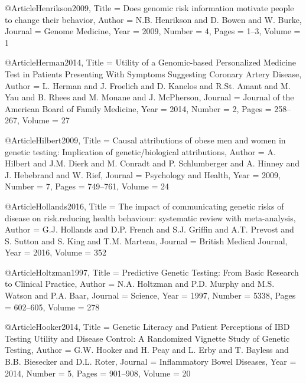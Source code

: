 @Article{Henrikson2009,
  Title                    = {Does genomic risk information motivate people to change their behavior},
  Author                   = {N.B. Henrikson and D. Bowen and W. Burke},
  Journal                  = {Genome Medicine},
  Year                     = {2009},
  Number                   = {4},
  Pages                    = {1--3},
  Volume                   = {1}
}

@Article{Herman2014,
  Title                    = {Utility of a Genomic-based Personalized Medicine Test in Patients Presenting With Symptoms Suggesting Coronary Artery Disease},
  Author                   = {L. Herman and J. Froelich and D. Kanelos and R.St. Amant and M. Yau and B. Rhees and M. Monane and J. McPherson},
  Journal                  = {Journal of the American Board of Family Medicine},
  Year                     = {2014},
  Number                   = {2},
  Pages                    = {258--267},
  Volume                   = {27}
}

@Article{Hilbert2009,
  Title                    = {Causal attributions of obese men and women in genetic testing: Implication of genetic/biological attributions},
  Author                   = {A. Hilbert and J.M. Dierk and M. Conradt and P. Schlumberger and A. Hinney and J. Hebebrand and W. Rief},
  Journal                  = {Psychology and Health},
  Year                     = {2009},
  Number                   = {7},
  Pages                    = {749--761},
  Volume                   = {24}
}

@Article{Hollands2016,
  Title                    = {The impact of communicating genetic risks of disease on risk.reducing health behaviour: systematic review with meta-analysis},
  Author                   = {G.J. Hollands and D.P. French and S.J. Griffin and A.T. Prevost and S. Sutton and S. King and T.M. Marteau},
  Journal                  = {British Medical Journal},
  Year                     = {2016},
  Volume                   = {352}
}

@Article{Holtzman1997,
  Title                    = {Predictive Genetic Testing: From Basic Research to Clinical Practice},
  Author                   = {N.A. Holtzman and P.D. Murphy and M.S. Watson and P.A. Baar},
  Journal                  = {Science},
  Year                     = {1997},
  Number                   = {5338},
  Pages                    = {602--605},
  Volume                   = {278}
}

@Article{Hooker2014,
  Title                    = {Genetic Literacy and Patient Perceptions of IBD Testing Utility and Disease Control: A Randomized Vignette Study of Genetic Testing},
  Author                   = {G.W. Hooker and H. Peay and L. Erby and T. Bayless and B.B. Biesecker and D.L. Roter},
  Journal                  = {Inflammatory Bowel Diseases},
  Year                     = {2014},
  Number                   = {5},
  Pages                    = {901--908},
  Volume                   = {20}
}

